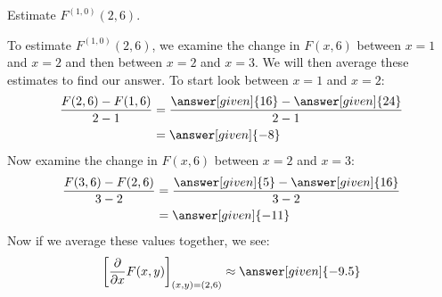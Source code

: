 \documentclass{ximera}
\begin{document}
\begin{example}
\begin{image}
  \end{image}
  Estimate $F^{(1,0)}(2,6)$.
  \begin{explanation}
    To estimate $F^{(1,0)}(2,6)$, we examine the change in $F(x,6)$
    between $x=1$ and $x=2$ and then between $x=2$ and $x=3$. We will
    then average these estimates to find our answer. To start look
    between $x=1$ and $x=2$:
    \begin{align*}
      \frac{F(2,6)-F(1,6)}{2-1}&= \frac{\answer[given]{16}-\answer[given]{24}}{2-1}\\
      &=\answer[given]{-8}
    \end{align*}
    Now examine the change in $F(x,6)$ between $x=2$ and $x=3$:
    \begin{align*}
      \frac{F(3,6)-F(2,6)}{3-2}&= \frac{\answer[given]{5}-\answer[given]{16}}{3-2}\\
      &=\answer[given]{-11}
    \end{align*}
    Now if we average these values together, we see:
    \[
    \eval{\pp{x} F(x,y)}_{(x,y)=(2,6)} \approx \answer[given]{-9.5}
    \]
  \end{explanation}
\end{example}
\end{document}
